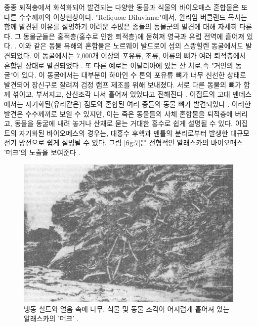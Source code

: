 \documentclass[10pt,twocolumn,letterpaper]{article}
\begin{document}
종종 퇴적층에서 화석화되어 발견되는 다양한 동물과 식물의 바이오매스 혼합물은 또 다른 수수께끼의 이상현상이다. "Reliquoæ Diluvianæ"에서, 윌리엄 버클랜드 목사는 함께 발견된 이유를 설명하기 어려운 수많은 종들의 동물군의 발견에 대해 자세히 다룬다. 그 동물군들은 홍적층(홍수로 인한 퇴적층)에 묻혀져 영국과 유럽 전역에 흩어져 있다. \cite{58}. 이와 같은 동물 유해의 혼합물은 노르웨이 발드로이 섬의 스쾅힐렌 동굴에서도 발견되었다. 이 동굴에서는 7,000개 이상의 포유류, 조류, 어류의 뼈가 여러 퇴적층에서 혼합된 상태로 발견되었다 \cite{59}. 또 다른 예로는 이탈리아에 있는 산 치로,즉 "거인의 동굴"이 있다. 이 동굴에서는 대부분이 하마인 수 톤의 포유류 뼈가 너무 신선한 상태로 발견되어 장신구로 잘려져 검정 램프 제조를 위해 보내졌다. 서로 다른 동물의 뼈가 함께 섞이고, 부서지고, 산산조각 나서 흩어져 있었다고 전해진다 \cite{60,61}. 이집트의 고대 멘데스에서는 자기화된(유리같은) 점토와 혼합된 여러 종들의 동물 뼈가 발견되었다 \cite{57}. 이러한 발견은 수수께끼로 보일 수 있지만, 이는 죽은 동물들의 사체 혼합물을 퇴적층에 버리고, 동물을  동굴에 내려 놓거나 산채로 묻는 거대한 홍수로 쉽게 설명될 수 있다. 이집트의 자기화된 바이오메스의 경우는,  대홍수 후핵과 맨틀의 분리로부터 발생한 대규모 전기 방전으로 쉽게 설명될 수 있다. 그림 \ref{fig:7}은 전형적인 알래스카의 바이오매스 '머크'의 노출을 보여준다 \cite{56}.

\begin{figure}[b]
\begin{center}
   \includegraphics[width=1\linewidth]{muck-crop.jpeg}
\end{center}
   \caption{ 냉동 실트와 얼음 속에 나무, 식물 및 동물 조각이 어지럽게 흩어져 있는 알래스카의 '머크' \cite{146}.}
\label{fig:7}
\label{fig:onecol}
\end{figure}
\end{document}
